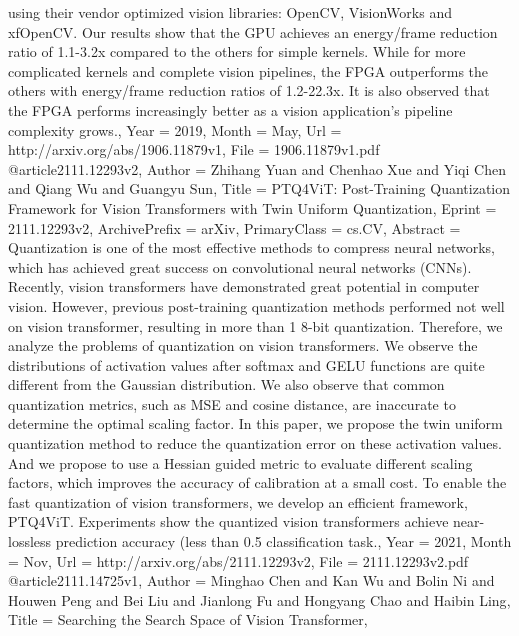 {{{{{using their vendor optimized vision libraries: OpenCV, VisionWorks and
xfOpenCV. Our results show that the GPU achieves an energy/frame reduction
ratio of 1.1-3.2x compared to the others for simple kernels. While for more
complicated kernels and complete vision pipelines, the FPGA outperforms the
others with energy/frame reduction ratios of 1.2-22.3x. It is also observed
that the FPGA performs increasingly better as a vision application's pipeline
complexity grows.},
Year          = {2019},
Month         = {May},
Url           = {http://arxiv.org/abs/1906.11879v1},
File          = {1906.11879v1.pdf}
}
@article{2111.12293v2,
Author        = {Zhihang Yuan and Chenhao Xue and Yiqi Chen and Qiang Wu and Guangyu Sun},
Title         = {PTQ4ViT: Post-Training Quantization Framework for Vision Transformers
  with Twin Uniform Quantization},
Eprint        = {2111.12293v2},
ArchivePrefix = {arXiv},
PrimaryClass  = {cs.CV},
Abstract      = {Quantization is one of the most effective methods to compress neural
networks, which has achieved great success on convolutional neural networks
(CNNs). Recently, vision transformers have demonstrated great potential in
computer vision. However, previous post-training quantization methods performed
not well on vision transformer, resulting in more than 1%
8-bit quantization. Therefore, we analyze the problems of quantization on
vision transformers. We observe the distributions of activation values after
softmax and GELU functions are quite different from the Gaussian distribution.
We also observe that common quantization metrics, such as MSE and cosine
distance, are inaccurate to determine the optimal scaling factor. In this
paper, we propose the twin uniform quantization method to reduce the
quantization error on these activation values. And we propose to use a Hessian
guided metric to evaluate different scaling factors, which improves the
accuracy of calibration at a small cost. To enable the fast quantization of
vision transformers, we develop an efficient framework, PTQ4ViT. Experiments
show the quantized vision transformers achieve near-lossless prediction
accuracy (less than 0.5%
classification task.},
Year          = {2021},
Month         = {Nov},
Url           = {http://arxiv.org/abs/2111.12293v2},
File          = {2111.12293v2.pdf}
}
@article{2111.14725v1,
Author        = {Minghao Chen and Kan Wu and Bolin Ni and Houwen Peng and Bei Liu and Jianlong Fu and Hongyang Chao and Haibin Ling},
Title         = {Searching the Search Space of Vision Transformer},
}}}}
